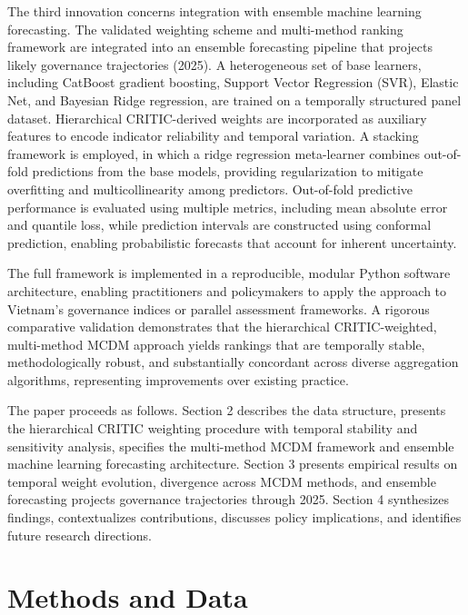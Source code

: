 \documentclass[12pt,a4paper]{article}
\begin{document}
The third innovation concerns integration with ensemble machine learning forecasting. The validated weighting scheme and multi-method ranking framework are integrated into an ensemble forecasting pipeline that projects likely governance trajectories (2025). A heterogeneous set of base learners, including CatBoost gradient boosting, Support Vector Regression (SVR), Elastic Net, and Bayesian Ridge regression, are trained on a temporally structured panel dataset. Hierarchical CRITIC-derived weights are incorporated as auxiliary features to encode indicator reliability and temporal variation. A stacking framework is employed, in which a ridge regression meta-learner combines out-of-fold predictions from the base models, providing regularization to mitigate overfitting and multicollinearity among predictors. Out-of-fold predictive performance is evaluated using multiple metrics, including mean absolute error and quantile loss, while prediction intervals are constructed using conformal prediction, enabling probabilistic forecasts that account for inherent uncertainty.

The full framework is implemented in a reproducible, modular Python software architecture, enabling practitioners and policymakers to apply the approach to Vietnam's governance indices or parallel assessment frameworks. A rigorous comparative validation demonstrates that the hierarchical CRITIC-weighted, multi-method MCDM approach yields rankings that are temporally stable, methodologically robust, and substantially concordant across diverse aggregation algorithms, representing improvements over existing practice.

The paper proceeds as follows. Section 2 describes the data structure, presents the hierarchical CRITIC weighting procedure with temporal stability and sensitivity analysis, specifies the multi-method MCDM framework and ensemble machine learning forecasting architecture. Section 3 presents empirical results on temporal weight evolution, divergence across MCDM methods, and ensemble forecasting projects governance trajectories through 2025. Section 4 synthesizes findings, contextualizes contributions, discusses policy implications, and identifies future research directions.


\section{Methods and Data}
\label{sec:methods}
\end{document}
